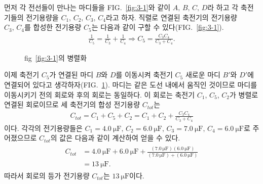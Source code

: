 \documentclass[tightenlines,floatfix,nofootinbib,superscriptaddress,fleqn]{revtex4-2}
\begin{document}
\noindent 먼저 각 전선들이 만나는 마디들을 FIG.~\ref{fig:3-1}와 같이 $A,\,B,\,C,\,D$라 하고 각
축전기들의 전기용량을 $C_1,\,C_2,\,C_3,\,C_4$라고 하자. 직렬로 연결된 축전기의 전기용량
$C_3,\,C_4$를 합성한 전기용량 $C_5$는 다음과 같이 구할 수 있다(FIG.~\ref{fig:3-1}).
\begin{align}
  \frac{1}{C_5} = \frac{1}{C_3}+\frac{1}{C_4} \Longrightarrow
  C_5 = \frac{C_3C_4}{C_3+C_4}.
\end{align}

\begin{figure}[htbp]
  \centering
  \caption{fig~\ref{fig:3-1}의 병렬화}
  \label{fig:3-2}
\end{figure}

이제 축전기 $C_5$가 연결된 마디 $B$와 $D$를 이동시켜 축전기 $C_5$ 새로운 마디 $B'$와 $D'$에
연결되어 있다고 생각하자(FIG.~\ref{fig:3-2}). 마디는 같은 도선 내에서 움직인 것이므로 
마디를 이동시키기 전의 회로와 후의 회로는 동일하다. 이 회로는 축전기 $C_1$, $C_5$, $C_2$가
병렬로 연결된 회로이므로 세 축전기의 합성 전기용량 $C_{tot}$는
\begin{align}
  C_{tot} = C_1 + C_5 + C_2 = C_1 + C_2 + \frac{C_3C_4}{C_3+C_4}
\end{align}
이다. 각각의 전기용량들은 $C_1= 4.0~\mathrm{\mu F},\,C_2= 6.0~\mathrm{\mu F},\,
C_3= 7.0~\mathrm{\mu F},\,C_4= 6.0~\mathrm{\mu F}$로 주어졌으므로 $C_{tot}$의 값은 다음과
같이 계산하여 얻을 수 있다.
\begin{align}
  \begin{split}
    C_{tot} &= 4.0~\mathrm{\mu F}+6.0~\mathrm{\mu F}
    +\frac{(7.0~\mathrm{\mu F})(6.0~\mathrm{\mu F})}
    {(7.0~\mathrm{\mu F})+(6.0~\mathrm{\mu F})} \\
    &= 13~\mathrm{\mu F}.
  \end{split}
\end{align}
따라서 회로의 등가 전기용량 $C_{tot}$는 $13~\mathrm{\mu F}$이다.
\vspace{1.cm}
\end{document}
